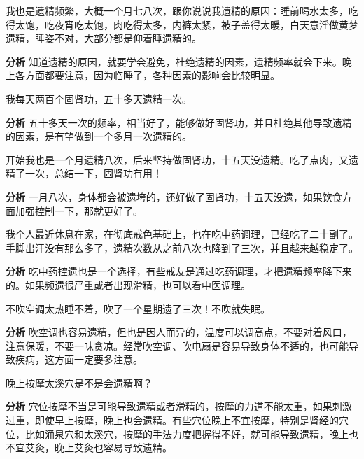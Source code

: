 \begin{case}
    我也是遗精频繁，大概一个月七八次，跟你说说我遗精的原因：睡前喝水太多，吃得太饱，吃夜宵吃太饱，肉吃得太多，内裤太紧，被子盖得太暖，白天意淫做黄梦遗精，睡姿不对，大部分都是仰着睡遗精的。

    \textbf{分析} 知道遗精的原因，就要学会避免，杜绝遗精的因素，遗精频率就会下来。晚上各方面都要注意，因为临睡了，各种因素的影响会比较明显。
\end{case}

\begin{case}
    我每天两百个固肾功，五十多天遗精一次。

    \textbf{分析} 五十多天一次的频率，相当好了，能够做好固肾功，并且杜绝其他导致遗精的因素，是有望做到一个多月一次遗精的。
\end{case}

\begin{case}
    开始我也是一个月遗精八次，后来坚持做固肾功，十五天没遗精。吃了点肉，又遗精了一次，总结一下，固肾功有用！

    \textbf{分析} 一月八次，身体都会被遗垮的，还好做了固肾功，十五天没遗，如果饮食方面加强控制一下，那就更好了。
\end{case}

\begin{case}
    我个人最近休息在家，在彻底戒色基础上，也在吃中药调理，已经吃了二十副了。手脚出汗没有那么多了，遗精次数从之前八次也降到了三次，并且越来越稳定了。

    \textbf{分析} 吃中药控遗也是一个选择，有些戒友是通过吃药调理，才把遗精频率降下来的。如果频遗很严重或者出现滑精，也可以看中医调理。
\end{case}

\begin{case}
    不吹空调太热睡不着，吹了一个星期遗了三次！不吹就失眠。

    \textbf{分析} 吹空调也容易遗精，但也是因人而异的，温度可以调高点，不要对着风口，注意保暖，不要一味贪凉。经常吹空调、吹电扇是容易导致身体不适的，也可能导致疾病，这方面一定要多注意。
\end{case}

\begin{case}
    晚上按摩太溪穴是不是会遗精啊？

    \textbf{分析} 穴位按摩不当是可能导致遗精或者滑精的，按摩的力道不能太重，如果刺激过重，即使早上按摩，晚上也会遗精。有些穴位晚上不宜按摩，特别是肾经的穴位，比如涌泉穴和太溪穴，按摩的手法力度把握得不好，就可能导致遗精，晚上也不宜艾灸，晚上艾灸也容易导致遗精。
\end{case}

